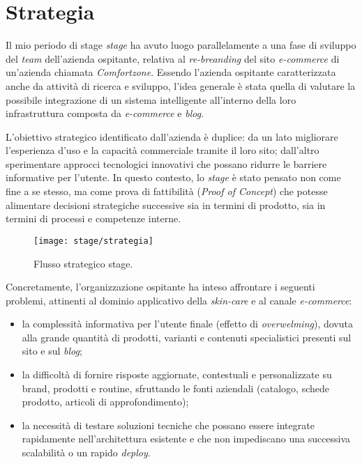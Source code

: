 \section{Strategia}

Il mio periodo di stage \emph{stage} ha avuto luogo parallelamente a una fase di sviluppo del \emph{team} dell'azienda ospitante, relativa al \emph{re-breanding} del sito \emph{e-commerce} 
di un'azienda chiamata \emph{Comfortzone}. Essendo l'azienda ospitante caratterizzata anche da attività di ricerca e sviluppo, l'idea generale è stata quella di 
valutare la possibile integrazione di un sistema intelligente all'interno della loro infrastruttura composta da \emph{e-commerce} e \emph{blog}. 

L'obiettivo strategico identificato dall'azienda è duplice: da un lato migliorare l'esperienza d'uso e la capacità commerciale tramite il loro sito; 
dall'altro sperimentare approcci tecnologici innovativi che possano ridurre le barriere informative per l'utente. 
In questo contesto, lo \emph{stage} è stato pensato non come fine a se stesso, ma come prova di fattibilità (\emph{Proof of Concept}) che potesse alimentare decisioni strategiche successive 
sia in termini di prodotto, sia in termini di processi e competenze interne.

\begin{figure}[htbp]
  \centering
  \texttt{[image: stage/strategia]}
  \caption{Flusso strategico stage.}
  \label{fig:strategia}
\end{figure}

Concretamente, l'organizzazione ospitante ha inteso affrontare i seguenti problemi, attinenti al dominio applicativo della \emph{skin-care} e al canale \emph{e-commerce}:

\begin{itemize}
  \item la complessità informativa per l'utente finale (effetto di \emph{overwelming}), dovuta alla grande quantità di prodotti, varianti e contenuti specialistici presenti sul sito e sul \emph{blog};
  \item la difficoltà di fornire risposte aggiornate, contestuali e personalizzate su brand, prodotti e routine, sfruttando le fonti aziendali (catalogo, schede prodotto, articoli di approfondimento);
  \item la necessità di testare soluzioni tecniche che possano essere integrate rapidamente nell'architettura esistente e che non impediscano una successiva scalabilità o un rapido \emph{deploy}.
\end{itemize}

